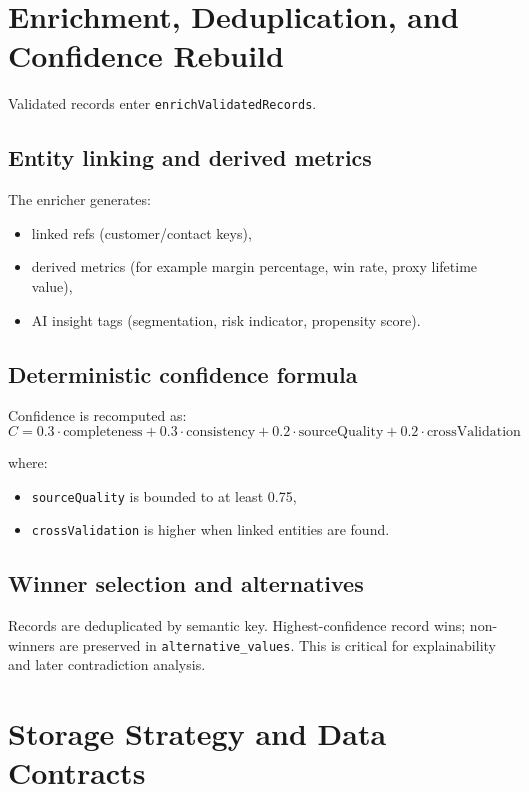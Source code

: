 \documentclass[11pt,a4paper]{article}
\begin{document}
\section{Enrichment, Deduplication, and Confidence Rebuild}
Validated records enter \texttt{enrichValidatedRecords}.

\subsection{Entity linking and derived metrics}
The enricher generates:
\begin{itemize}[leftmargin=*]
  \item linked refs (customer/contact keys),
  \item derived metrics (for example margin percentage, win rate, proxy lifetime value),
  \item AI insight tags (segmentation, risk indicator, propensity score).
\end{itemize}

\subsection{Deterministic confidence formula}
Confidence is recomputed as:
\[
C = 0.3 \cdot \text{completeness} + 0.3 \cdot \text{consistency} + 0.2 \cdot \text{sourceQuality} + 0.2 \cdot \text{crossValidation}
\]

where:
\begin{itemize}[leftmargin=*]
  \item \texttt{sourceQuality} is bounded to at least 0.75,
  \item \texttt{crossValidation} is higher when linked entities are found.
\end{itemize}

\subsection{Winner selection and alternatives}
Records are deduplicated by semantic key. Highest-confidence record wins; non-winners are preserved in \texttt{alternative\_values}. This is critical for explainability and later contradiction analysis.

\section{Storage Strategy and Data Contracts}
\end{document}
